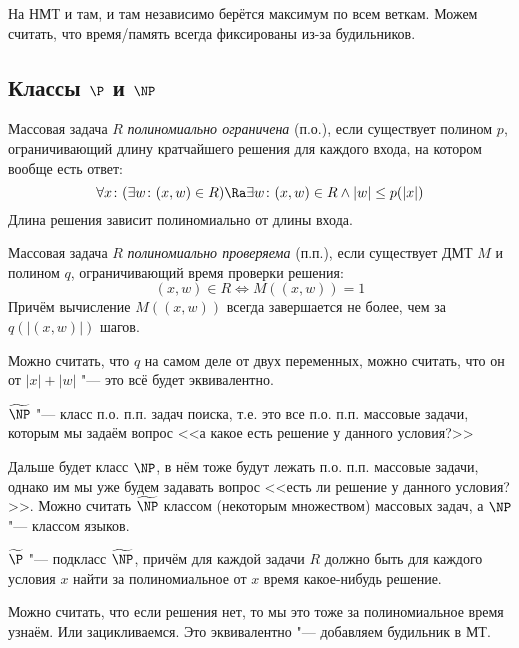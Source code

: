 	На НМТ и там, и там независимо берётся максимум по всем веткам.
	Можем считать, что время/память всегда фиксированы из-за будильников.

\subsection{Классы $\P$ и $\NP$}
	\begin{Def}
		Массовая задача $R$ \textit{полиномиально ограничена} (п.о.), если существует полином $p$, ограничивающий длину кратчайшего решения для каждого входа,
		на котором вообще есть ответ:
		\[
			\forall x \colon (\exists w \colon (x, w) \in R) \Ra \exists w \colon (x, w) \in R \land |w| \le p(|x|)
		\]
		Длина решения зависит полиномиально от длины входа.
	\end{Def}
	\begin{Def}
		Массовая задача $R$ \textit{полиномиально проверяема} (п.п.), если существует ДМТ $M$ и полином $q$, ограничивающий время проверки решения:
		\[
			(x, w) \in R \iff M((x, w))=1
		\]
		Причём вычисление $M((x, w))$ всегда завершается не более, чем за $q(|(x, w)|)$ шагов.
	\end{Def}
	\begin{Rem}
		Можно считать, что $q$ на самом деле от двух переменных, можно считать, что он от $|x|+|w|$ "--- это всё будет эквивалентно.
	\end{Rem}

	\begin{Def}
		$\widetilde{\NP}$ "--- класс п.о. п.п. задач поиска, т.е. это все п.о. п.п. массовые задачи, которым мы задаём вопрос <<а какое есть решение у данного условия?>>
	\end{Def}
	\begin{Rem}
		Дальше будет класс $\NP$, в нём тоже будут лежать п.о. п.п. массовые задачи, однако им мы уже будем задавать вопрос <<есть ли решение у данного условия?>>.
		Можно считать $\widetilde{\NP}$ классом (некоторым множеством) массовых задач, а $\NP$ "--- классом языков.
	\end{Rem}

	\begin{Def}
		$\widetilde{\P}$ "--- подкласс $\widetilde{\NP}$, причём для каждой задачи $R$ должно быть для каждого условия $x$ найти за полиномиальное от $x$ время какое-нибудь решение.
	\end{Def}
	\begin{Rem}
		Можно считать, что если решения нет, то мы это тоже за полиномиальное время узнаём.
		Или зацикливаемся.
		Это эквивалентно "--- добавляем будильник в МТ.
	\end{Rem}

